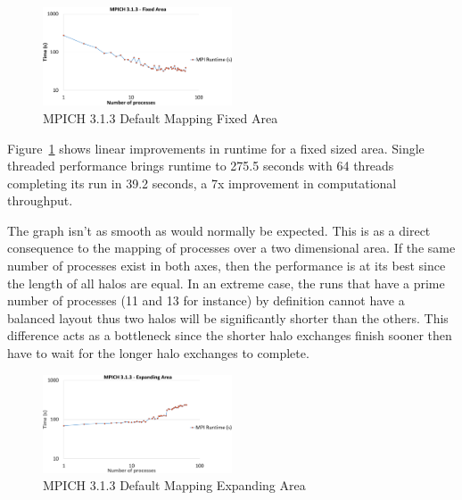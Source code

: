 \begin{figure}
    \includegraphics[page=1,width=0.5\textwidth]
    {graphs/MPICH313-default-mapping-fixed-area-crop.pdf}
    \caption{MPICH 3.1.3 Default Mapping Fixed Area}
    \label{fig:mpichdefaultmappingfixedarea}
\end{figure}

Figure~\ref{fig:mpichdefaultmappingfixedarea} shows linear improvements in
runtime for a fixed sized area. Single threaded performance brings runtime to
275.5 seconds with 64 threads completing its run in 39.2 seconds, a 7x
improvement in computational throughput.

The graph isn't as smooth as would normally be expected. This is as a direct
consequence to the mapping of processes over a two dimensional area. If the same
number of processes exist in both axes, then the performance is at its best
since the length of all halos are equal. In an extreme case, the runs that have
a prime number of processes (11 and 13 for instance) by definition cannot have a
balanced layout thus two halos will be significantly shorter than the others.
This difference acts as a bottleneck since the shorter halo exchanges finish
sooner then have to wait for the longer halo exchanges to complete.

\begin{figure}
    \includegraphics[page=1,width=0.5\textwidth]
    {graphs/MPICH313-default-mapping-expanding-area-crop.pdf}
    \caption{MPICH 3.1.3 Default Mapping Expanding Area}
    \label{fig:mpichdefaultmappingexpandingarea}
\end{figure}

